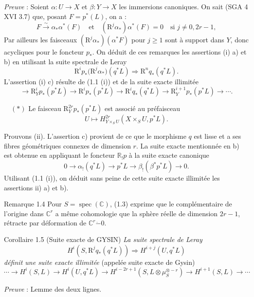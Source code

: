 \emph{Preuve} : Soient $\alpha:U\to X$ et $\beta:Y\to X$ les immersions canoniques. On sait (SGA 4 XVI 3.7) que, posant $F=p^*(L)$, on a :
\[
F\xrightarrow{\sim}\alpha_*\alpha^*(F)
\quad\text{et}\quad
(\mathrm{R}^j\alpha_*)\alpha^*(F)=0\quad\text{si }j\ne0,2r-1,
\]
Par ailleurs les faisceaux $(\mathrm{R}^j\alpha_*)(\alpha^*F)$ pour $j\ge1$ sont à support dans $Y$, donc acycliques pour le foncteur $p_*$. On déduit de ces remarques les assertions (i) a) et b) en utilisant la suite spectrale de Leray
\[
\mathrm{R}^i p_*\bigl(\mathrm{R}^j\alpha_*\bigr)(q^*L)\Longrightarrow \mathrm{R}^n q_*(q^*L).
\]
L'assertion (i) c) résulte de (1.1 (i)) et de la suite exacte illimitée
\[
\longrightarrow \mathrm{R}_Y^i p_*(p^*L)\longrightarrow \mathrm{R}^i p_*(p^*L)\longrightarrow \mathrm{R}^i q_*(q^*L)
\longrightarrow \mathrm{R}_Y^{i+1}p_*(p^*L)\longrightarrow\cdots.
\]

\(\quad (*)\) Le faisceau $\mathrm{R}_Y^{2r}p_*(p^*L)$ est associé au préfaisceau
\[
U\longmapsto H^{2r}_{Y\times_S U}(X\times_S U,p^*L).
\]

Prouvons (ii). L'assertion c) provient de ce que le morphisme $q$ est lisse et a ses fibres géométriques connexes de dimension $r$. La suite exacte mentionnée en b) est obtenue en appliquant le foncteur $\mathbb{R}_!p$ à la suite exacte canonique
\[
0\longrightarrow \alpha_!(q^*L)\longrightarrow p^*L\longrightarrow \beta_!(\beta^*p^*L)\longrightarrow 0.
\]
Utilisant (1.1 (i)), on déduit sans peine de cette suite exacte illimitée les assertions ii) a) et b).

\begin{statement}{Remarque 1.4}
Pour $S=\operatorname{spec}(\mathbb{C})$, (1.3) exprime que le complémentaire de l'origine dans $\mathbb{C}^r$ a même cohomologie que la sphère réelle de dimension $2r-1$, rétracte par déformation de $\mathbb{C}^r\mathbin{\dot{-}}0$.
\end{statement}

\begin{statement}{Corollaire 1.5 (Suite exacte de GYSIN)}
\emph{La suite spectrale de Leray}
\[
H^i(S,\mathrm{R}^j q_*(q^*L))\Rightarrow H^{i+j}(U,q^*L)
\]
\emph{définit une suite exacte illimitée} (appelée suite exacte de Gysin)
\[
\cdots\longrightarrow H^i(S,L)\longrightarrow H^i(U,q^*L)\longrightarrow
H^{i-2r+1}(S,L\otimes\mu_S^{\otimes -r})\longrightarrow H^{i+1}(S,L)\longrightarrow\cdots
\]
\end{statement}

\emph{Preuve} : Lemme des deux lignes.

